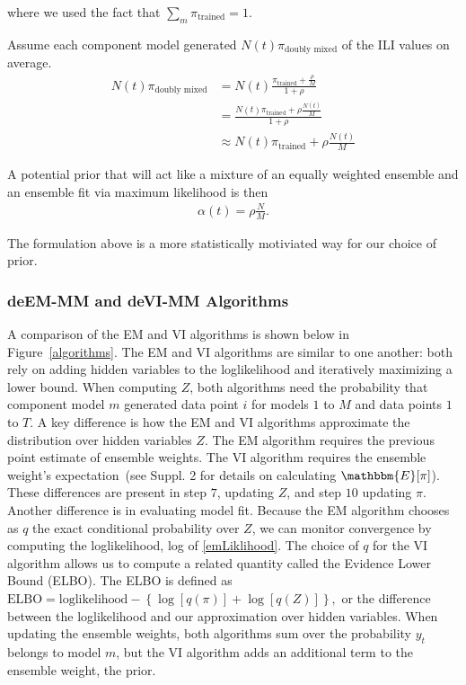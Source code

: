 \documentclass[sagev,times,Review,10pt]{sagej}
\def\l{\left}
\def\r{\right}
\newcommand{\f}{\frac}
\begin{document}
where we used the fact that $\sum_{m} \pi_{\text{trained}} = 1$.


Assume each component model generated $N(t) \pi_{\text{doubly mixed}}$ of the ILI values on average.
\begin{align}
  N(t) \pi_{\text{doubly mixed}}  &=  N(t) \f{\pi_{\text{trained}} + \f{\rho}{M}}{1 + \rho} \nonumber \\ 
                               &= \f{ N(t)\pi_{\text{trained}} + \rho \f{ N(t)}{M}}{1 + \rho} \nonumber \\
                               & \approx  N(t)\pi_{\text{trained}} + \rho \f{ N(t)}{M}
\end{align}

A potential prior that will act like a mixture of an equally weighted ensemble and an ensemble fit via maximum likelihood is then
\begin{align*}
  \alpha(t) = \rho \f{N}{M}.
\end{align*}

The formulation above is a more statistically motiviated way for our choice of prior.


\subsubsection{deEM-MM and deVI-MM Algorithms}
A comparison of the EM and VI algorithms is shown below in Figure~\ref{algorithms}.
The EM and VI algorithms are similar to one another: both rely on adding hidden variables to the loglikelihood and iteratively maximizing a lower bound.
When computing $Z$, both algorithms need the probability that component model $m$ generated data point $i$ for models $1$ to $M$ and data points $1$ to $T$. 
A key difference is how the EM and VI algorithms approximate the distribution over hidden variables $Z$.
The EM algorithm requires the previous point estimate of ensemble weights.
The VI algorithm requires the ensemble weight's expectation~(see Suppl. 2 %
for details on calculating $\mathbbm{E}[\pi]$).
These differences are present in step $7$, updating $Z$, and step $10$ updating $\pi$.
Another difference is in evaluating model fit.
Because the EM algorithm chooses as $q$ the exact conditional probability over $Z$, we can monitor convergence by computing the loglikelihood, log of \eqref{emLiklihood}.
The choice of $q$ for the VI algorithm allows us to compute a related quantity called the Evidence Lower Bound (ELBO).
The ELBO is defined as
$ %
  \text{ELBO} = \text{loglikelihood} - \l\{\log[q(\pi)] + \log[q(Z)]\r\},
$ %
or the difference between the loglikelihood and our approximation over hidden variables.
When updating the ensemble weights, both algorithms sum over the probability $y_{t}$ belongs to model $m$, but the VI algorithm adds an additional term to the ensemble weight, the prior.
\end{document}
